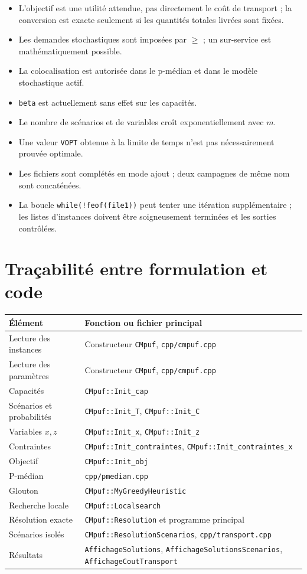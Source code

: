 \documentclass[11pt,a4paper]{article}
\newcommand{\code}[1]{\texttt{#1}}
\begin{document}
\begin{itemize}
  \item L'objectif est une utilité attendue, pas directement le coût de
        transport ; la conversion est exacte seulement si les quantités
        totales livrées sont fixées.
  \item Les demandes stochastiques sont imposées par $\geq$ ; un sur-service
        est mathématiquement possible.
  \item La colocalisation est autorisée dans le p-médian et dans le modèle
        stochastique actif.
  \item \code{beta} est actuellement sans effet sur les capacités.
  \item Le nombre de scénarios et de variables croît exponentiellement avec
        $m$.
  \item Une valeur \code{VOPT} obtenue à la limite de temps n'est pas
        nécessairement prouvée optimale.
  \item Les fichiers sont complétés en mode ajout ; deux campagnes de même nom
        sont concaténées.
  \item La boucle \code{while(!feof(file1))} peut tenter une itération
        supplémentaire ; les listes d'instances doivent être soigneusement
        terminées et les sorties contrôlées.
\end{itemize}

\section{Traçabilité entre formulation et code}

\begin{longtable}{p{5.2cm}p{9cm}}
\toprule
Élément & Fonction ou fichier principal\\
\midrule
\endhead
Lecture des instances & Constructeur \code{CMpuf}, \code{cpp/cmpuf.cpp}\\
Lecture des paramètres & Constructeur \code{CMpuf}, \code{cpp/cmpuf.cpp}\\
Capacités & \code{CMpuf::Init\_cap}\\
Scénarios et probabilités & \code{CMpuf::Init\_T}, \code{CMpuf::Init\_C}\\
Variables $x,z$ & \code{CMpuf::Init\_x}, \code{CMpuf::Init\_z}\\
Contraintes & \code{CMpuf::Init\_contraintes},
\code{CMpuf::Init\_contraintes\_x}\\
Objectif & \code{CMpuf::Init\_obj}\\
P-médian & \code{cpp/pmedian.cpp}\\
Glouton & \code{CMpuf::MyGreedyHeuristic}\\
Recherche locale & \code{CMpuf::Localsearch}\\
Résolution exacte & \code{CMpuf::Resolution} et programme principal\\
Scénarios isolés & \code{CMpuf::ResolutionScenarios},
\code{cpp/transport.cpp}\\
Résultats & \code{AffichageSolutions},
\code{AffichageSolutionsScenarios}, \code{AffichageCoutTransport}\\
\bottomrule
\end{longtable}
\end{document}
